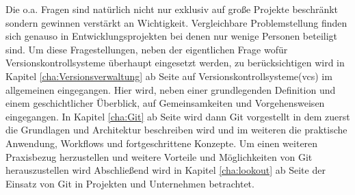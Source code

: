 Die o.a. Fragen sind natürlich nicht nur exklusiv auf große Projekte beschränkt
sondern gewinnen verstärkt an Wichtigkeit. Vergleichbare Problemstellung finden
sich genauso in Entwicklungsprojekten bei denen nur wenige Personen beteiligt
sind. Um diese Fragestellungen, neben der eigentlichen Frage wofür
Versionskontrollsysteme überhaupt eingesetzt werden, zu berücksichtigen wird in
Kapitel \ref{cha:Versionsverwaltung} ab Seite \pageref{cha:Versionsverwaltung}
auf Versionskontrollsysteme(\acrshort{vcs}) im allgemeinen eingegangen. Hier
wird, neben einer grundlegenden Definition und einem geschichtlicher Überblick,
auf Gemeinsamkeiten und Vorgehensweisen eingegangen. In Kapitel \ref{cha:Git}
ab Seite \pageref{cha:Git} wird dann Git vorgestellt in dem zuerst die
Grundlagen und Architektur beschreiben wird und im weiteren die praktische
Anwendung, Workflows und fortgeschrittene Konzepte. Um einen weiteren
Praxisbezug herzustellen und weitere Vorteile und Möglichkeiten von Git
herauszustellen wird Abschließend wird in Kapitel \ref{cha:lookout} ab Seite
\pageref{cha:lookout} der Einsatz von Git in Projekten und Unternehmen
betrachtet.
